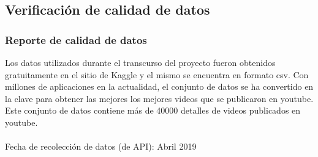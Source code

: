             \begin{figure}[ht]
            \end{figure}
        \FloatBarrier

\subsection{Verificación de calidad de datos}
    \subsubsection{Reporte de calidad de datos}
        Los datos utilizados durante el transcurso del proyecto fueron obtenidos
        gratuitamente en el sitio de Kaggle y el mismo se encuentra en formato csv.
        Con millones de aplicaciones en la actualidad, el conjunto de datos se
        ha convertido en la clave para obtener las mejores los mejores videos
        que se publicaron en youtube. Este conjunto de datos contiene más de
        40000 detalles de videos publicados en youtube.\\\\
        Fecha de recolección de datos (de API): Abril 2019